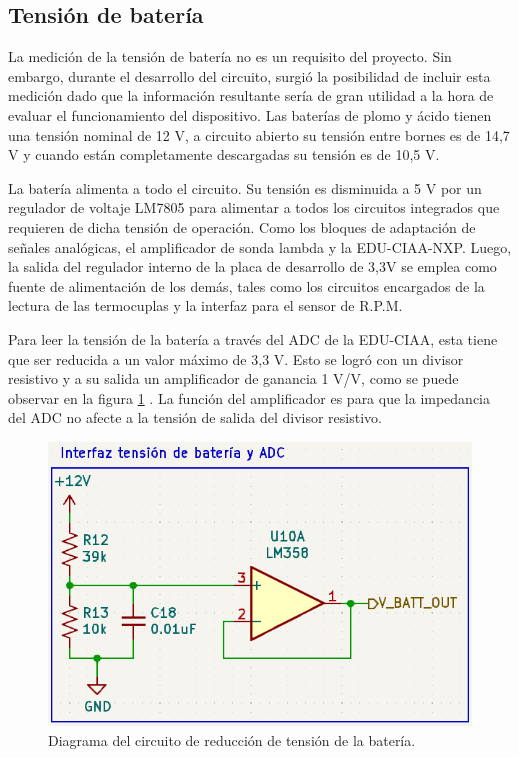\subsection{Tensión de batería}

La medición de la tensión de batería no es un requisito del proyecto. Sin embargo, durante el desarrollo del circuito, surgió la posibilidad de incluir esta medición dado que la información resultante sería de gran utilidad a la hora de evaluar el funcionamiento del dispositivo.
Las baterías de plomo y ácido tienen una tensión nominal de 12 V, a circuito abierto su tensión entre bornes es de 14,7 V y cuando están completamente descargadas su tensión es de 10,5 V.

La batería alimenta a todo el circuito. Su tensión es disminuida a 5 V por un regulador de voltaje LM7805 para alimentar a todos los circuitos integrados que requieren de dicha tensión de operación. Como los bloques de adaptación de señales analógicas, el amplificador de sonda lambda y la EDU-CIAA-NXP. Luego, la salida del regulador interno de la placa de desarrollo de 3,3V se emplea como fuente de alimentación de los demás, tales como los circuitos encargados de la lectura de las termocuplas y la interfaz para el sensor de R.P.M.

Para leer la tensión de la batería a través del ADC de la EDU-CIAA, esta tiene que ser reducida a un valor máximo de 3,3 V. Esto se logró con un divisor resistivo y a su salida un amplificador de ganancia 1 V/V, como se puede observar en la figura \ref{fig:circuito-bat} . La función del amplificador es para que la impedancia del ADC no afecte a la tensión de salida del divisor resistivo.

\begin{figure}[htpb]
\centering
\includegraphics[width=.7\textwidth]{./Figures/ampli-bat.png}
\caption{Diagrama del circuito de reducción de tensión de la batería.}
\label{fig:circuito-bat}
\end{figure}

